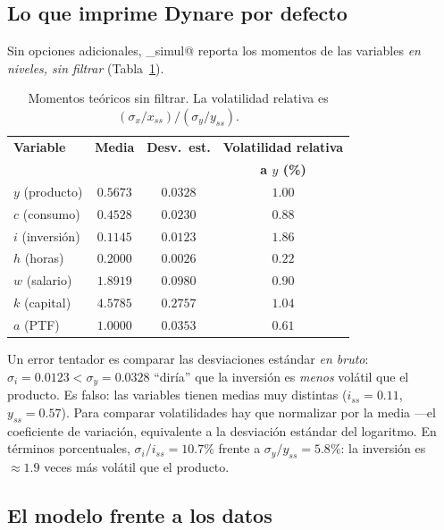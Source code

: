 \documentclass[11pt,a4paper]{report}
\newcounter{tcbrem}[section]
\renewcommand{\thetcbrem}{\thesection.\arabic{tcbrem}}
\newenvironment{remark}{%
  \refstepcounter{tcbrem}%
  \begin{tcolorbox}[remarkstyle, title={Observación~\thetcbrem}]}%
{\end{tcolorbox}}
\begin{document}
\subsection{Lo que imprime Dynare por defecto}
\label{sec:dynaremoments}

Sin opciones adicionales, \lstinline@stoch_simul@ reporta los momentos de las
variables \emph{en niveles, sin filtrar} (Tabla~\ref{tab:moments}).

\begin{table}[H]
\centering\small
\begin{tabular}{lccc}
\toprule
\textbf{Variable} & \textbf{Media} & \textbf{Desv.\ est.} & \textbf{Volatilidad relativa}\\
 & & & \textbf{a $y$ (\%)}\\
\midrule
$y$ (producto)   & $0.5673$ & $0.0328$ & $1.00$ \\
$c$ (consumo)    & $0.4528$ & $0.0230$ & $0.88$ \\
$i$ (inversión)  & $0.1145$ & $0.0123$ & $1.86$ \\
$h$ (horas)      & $0.2000$ & $0.0026$ & $0.22$ \\
$w$ (salario)    & $1.8919$ & $0.0980$ & $0.90$ \\
$k$ (capital)    & $4.5785$ & $0.2757$ & $1.04$ \\
$a$ (PTF)        & $1.0000$ & $0.0353$ & $0.61$ \\
\bottomrule
\end{tabular}
\caption{Momentos teóricos sin filtrar. La volatilidad relativa es
$(\sigma_x/x_{ss})/(\sigma_y/y_{ss})$.}
\label{tab:moments}
\end{table}

\begin{remark}
Un error tentador es comparar las desviaciones estándar \emph{en bruto}:
$\sigma_i=0.0123<\sigma_y=0.0328$ ``diría'' que la inversión es \emph{menos}
volátil que el producto. Es falso: las variables tienen medias muy distintas
($i_{ss}=0.11$, $y_{ss}=0.57$). Para comparar volatilidades hay que normalizar
por la media ---el coeficiente de variación, equivalente a la desviación
estándar del logaritmo. En términos porcentuales, $\sigma_i/i_{ss}=10.7\%$ frente
a $\sigma_y/y_{ss}=5.8\%$: la inversión es $\approx1.9$ veces más volátil que el
producto.
\end{remark}

\subsection{El modelo frente a los datos}
\label{sec:modelvsdata}
\end{document}
